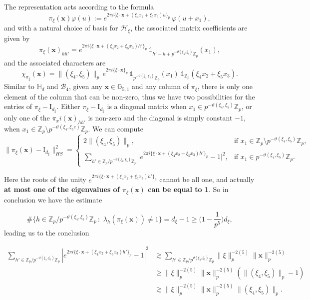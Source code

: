 \documentclass[12pt, reqno]{amsart}
\newcommand{\Z}{\mathbb{Z}}
\newcommand{\1}{\mathds{1}}
\newcommand{\G}{\mathbb{G}}
\begin{document}
The representation acts according to the formula
\[
\pi_\xi(\mathbf{x})\varphi(u)
:=
e^{2\pi i \{\xi \cdot \mathbf{x} + (\xi_4 x_2 + \xi_5 x_3)u\}_p}
\, \varphi(u + x_1),
\]and with a natural choice of basis for $\mathcal{H}_\xi$, the associated matrix coefficients are given by
\[
\pi_\xi(\mathbf{x})_{hh'}
=
e^{2\pi i \{\xi \cdot \mathbf{x} + (\xi_4 x_2 + \xi_5 x_3)h'\}_p}
\, \1_{h'-h + p^{-\vartheta(\xi_4,\xi_5)}\mathbb{Z}_p}(x_1),
\]
and the associated characters are
\[
\chi_{\pi_\xi}(\mathbf{x})
=
\|(\xi_4,\xi_5)\|_p
\, e^{2\pi i \{\xi \cdot \mathbf{x}\}_p}
\, \1_{p^{-\vartheta(\xi_4,\xi_5)}\mathbb{Z}_p}(x_1)
\, \1_{\mathbb{Z}_p}(\xi_4 x_2 + \xi_5 x_3).
\]
Similar to $\mathbb{H}_d$ and $\mathcal{B}_4$, given any $\mathbf{x} \in \G_{5,1} $ and any column of $\pi_\xi$, there is only one element of the column that can be non-zero, thus we have two possibilities for the entries of $\pi_\xi - \mathrm{I}_{d_\xi}$. Either $\pi_\xi - \mathrm{I}_{d_\xi}$ is a diagonal matrix when $x_1 \in p^{-\vartheta(\xi_4, \xi_5)}\Z_p$, or only one of the $\pi_xi(\mathbf{x})_{hh'}$ is non-zero and the diagonal is simply constant $-1$, when $x_1 \in \Z_p \setminus p^{-\vartheta(\xi_4, \xi_5e)}\Z_p$. We can compute
\[
\|\pi_\xi(\mathbf{x}) - \mathrm{I}_{d_\xi}\|^2_{HS} =
\begin{cases}
2\| (\xi_4 , \xi_5)\|_p, & \text{if } x_1 \in \mathbb{Z}_p \setminus p^{-\vartheta(\xi_4, \xi_5)}\mathbb{Z}_p, \\[6pt]
\displaystyle \sum_{h' \in \mathbb{Z}_p / p^{-\vartheta(\xi_4, \xi_5)} \mathbb{Z}_p}
\Big| e^{2\pi i \{\xi \cdot \mathbf{x} + (\xi_4 x_2 + \xi_5 x_3)h'\}_p} - 1 \Big|^2, & 
\text{if } x_1 \in p^{-\vartheta(\xi_4, \xi_5)}\mathbb{Z}_p.
\end{cases}
\]

Here the roots of the unity $e^{2\pi i \{\xi \cdot \mathbf{x} + (\xi_4 x_2 + \xi_5 x_3)h'\}_p}$ cannot be all one, and actually \textbf{at most one of the eigenvalues of $\pi_\xi (\mathbf{x})$ can be equal to 1}. So in conclusion we have the estimate

$$\# \{ h \in \mathbb{Z}_p / p^{-\vartheta(\xi_4, \xi_5)} \mathbb{Z}_p \, :  \,\, \lambda_h (\pi_\xi (\mathbf{x})) \neq 1 \}= d_\xi -1 \geq \big( 1 -\frac{1}{p^{5}} \big)  d_\xi, $$
leading us to the conclusion

\begin{align*}
\sum_{ h' \in \mathbb{Z}_p / p^{-\vartheta(\xi_4, \xi_5)} \mathbb{Z}_p } 
\left| e^{2\pi i \{\xi \cdot \mathbf{x} + (\xi_4 x_2 + \xi_5 x_3)h'\}_p} - 1 \right|^2 
&\gtrsim \sum_{h' \in \mathbb{Z}_p / p^{\vartheta (\xi_4 , \xi_5)} \mathbb{Z}_p}
\|\xi\|_p^{-2(5)} \|\mathbf{x}\|_p^{-2(5)} \\
&\geq   \|\xi\|_p^{-2(5)} \|\mathbf{x}\|_p^{-2(5)} (\|(\xi_4, \xi_5 )\|_p - 1) \\
&\gtrsim \|\xi\|_p^{-2(5)} \|\mathbf{x}\|_p^{-2(5)} \| (\xi_4 , \xi_5) \|_p.
\end{align*}
\end{document}
